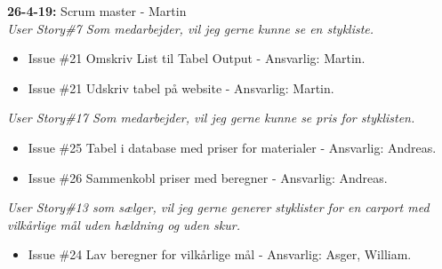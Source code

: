 \documentclass[11pt]{report}
\begin{document}
\noindent\textbf{26-4-19:} Scrum master - Martin\\
\textit{User Story\#7 Som medarbejder, vil jeg gerne kunne se en stykliste.}
\begin{itemize}
\renewcommand\labelitemi{--}
\item Issue \#21 Omskriv List til Tabel Output - Ansvarlig: Martin.
\item Issue \#21 Udskriv tabel på website - Ansvarlig: Martin.
\end{itemize}
\textit{User Story\#17 Som medarbejder, vil jeg gerne kunne se pris for styklisten.}
\begin{itemize}
\renewcommand\labelitemi{--}
\item Issue \#25 Tabel i database med priser for materialer - Ansvarlig: Andreas.
\item Issue \#26 Sammenkobl priser med beregner - Ansvarlig: Andreas.
\end{itemize}
\textit{User Story\#13 som sælger, vil jeg gerne generer styklister for en carport med vilkårlige mål uden hældning og uden skur.}
\begin{itemize}
\renewcommand\labelitemi{--}
\item Issue \#24 Lav beregner for vilkårlige mål - Ansvarlig: Asger, William.
\end{itemize}
\end{document}
